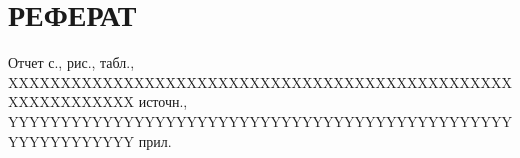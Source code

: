 \section*{РЕФЕРАТ}

Отчет \pageref{LastPage} с.,  рис.,  табл., XXXXXXXXXXXXXXXXXXXXXXXXXXXXXXXXXXXXXXXXXXXXXXXXXXXXXXXXXXXX источн., YYYYYYYYYYYYYYYYYYYYYYYYYYYYYYYYYYYYYYYYYYYYYYYYYYYYYYYYYYYY прил.
